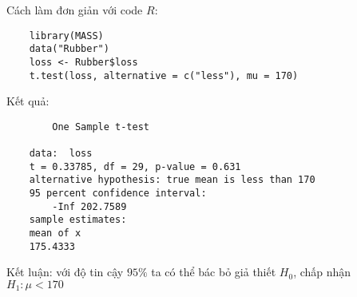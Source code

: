 Cách làm đơn giản với code $R$:
\begin{lstlisting}
    library(MASS)
    data("Rubber")
    loss <- Rubber$loss
    t.test(loss, alternative = c("less"), mu = 170)
\end{lstlisting}
Kết quả:
\begin{lstlisting}
        One Sample t-test

    data:  loss
    t = 0.33785, df = 29, p-value = 0.631
    alternative hypothesis: true mean is less than 170
    95 percent confidence interval:
        -Inf 202.7589
    sample estimates:
    mean of x 
    175.4333 
\end{lstlisting}
Kết luận: với độ tin cậy $95\%$ ta có thể bác bỏ giả thiết $H_0$, chấp nhận $H_1: \mu < 170$
